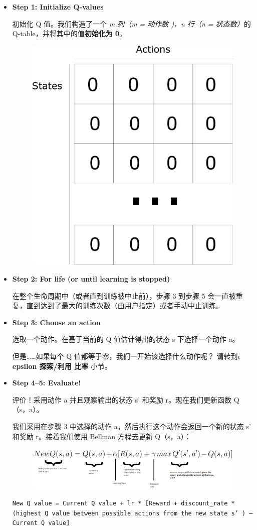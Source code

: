 \documentclass[UTF8,a4paper,12pt]{ctexbook}
\begin{document}
				
					\begin{itemize}
						\item \textbf{Step 1: Initialize Q-values}
						
							初始化 Q 值。我们构造了一个\textit{ m 列（m = 动作数 )，n 行（n = 状态数）}的 Q-table，并将其中的值\textbf{初始化为 0}。
							
							\begin{figure}[H]
								\centering
								\includegraphics[width=.4\linewidth]{qFuncProcess01}
							\end{figure}
							
						\item \textbf{Step 2: For life (or until learning is stopped)}
							
							在整个生命周期中（或者直到训练被中止前），步骤 3 到步骤 5 会一直被重复，直到达到了最大的训练次数（由用户指定）或者手动中止训练。
							
						\item \textbf{Step 3: Choose an action}
						
							选取一个动作。在基于当前的 Q 值估计得出的状态 s 下选择一个动作 a。
							
							但是……如果每个 Q 值都等于零，我们一开始该选择什么动作呢？ 请转到\textbf{$\epsilon$ epsilon 探索/利用 比率} 小节。
						
						\item \textbf{Step 4–5: Evaluate!}
						
							评价！采用动作 a 并且观察输出的状态 s' 和奖励 r。现在我们更新函数 Q（s，a）。
							
							我们采用在步骤 3 中选择的动作 a，然后执行这个动作会返回一个新的状态 s' 和奖励 r。接着我们使用 Bellman 方程去更新 Q（s，a）：
							\begin{figure}[H]
								\centering
								\includegraphics[width=.9\linewidth]{qFuncProcess02}
							\end{figure}	
							
							\begin{lstlisting}
New Q value = Current Q value + lr * [Reward + discount_rate * (highest Q value between possible actions from the new state s’ ) — Current Q value]							
							\end{lstlisting}						
							
					\end{itemize}
				
\end{document}
